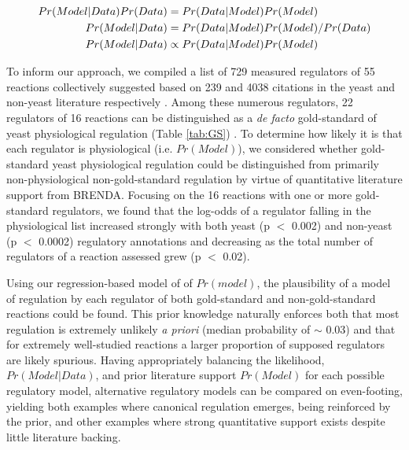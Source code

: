 \begin{align}
Pr(Model | Data) Pr(Data) &= Pr(Data | Model) Pr(Model)\notag\\
Pr(Model | Data) &= Pr(Data | Model) Pr(Model) / Pr(Data)\notag\\
Pr(Model | Data) &\propto Pr(Data | Model) Pr(Model)\label{eqtn-bayes}
\end{align}

To inform our approach, we compiled a list of 729 measured regulators of 55 reactions collectively suggested based on 239 and 4038 citations in the yeast and non-yeast literature respectively \cite{Scheer:2011df}.  Among these numerous regulators, 22 regulators of 16 reactions can be distinguished as a \textit{de facto} gold-standard of yeast physiological regulation (Table \ref{tab:GS}) \cite{Jones:1982dn, Sekine:2007ej, Fraenkel:2011wp}.  To determine how likely it is that each regulator is physiological (i.e. $Pr(Model)$), we considered whether gold-standard yeast physiological regulation could be distinguished from primarily non-physiological non-gold-standard regulation by virtue of quantitative literature support from BRENDA.  Focusing on the 16 reactions with one or more gold-standard regulators, we found that the log-odds of a regulator falling in the physiological list increased strongly with both yeast (p $<$ 0.002) and non-yeast (p $<$ 0.0002) regulatory annotations and decreasing as the total number of regulators of a reaction assessed grew (p $<$ 0.02).

Using our regression-based model of of $Pr(model)$, the plausibility of a model of regulation by each regulator of both gold-standard and non-gold-standard reactions could be found. This prior knowledge naturally enforces both that most regulation is extremely unlikely \textit{a priori} (median probability of $\sim$ 0.03) and that for extremely well-studied reactions a larger proportion of supposed regulators are likely spurious.  Having appropriately balancing the likelihood, $Pr(Model | Data)$, and prior literature support $Pr(Model)$ for each possible regulatory model, alternative regulatory models can be compared on even-footing, yielding both examples where canonical regulation emerges, being reinforced by the prior, and other examples where strong quantitative support exists despite little literature backing.

